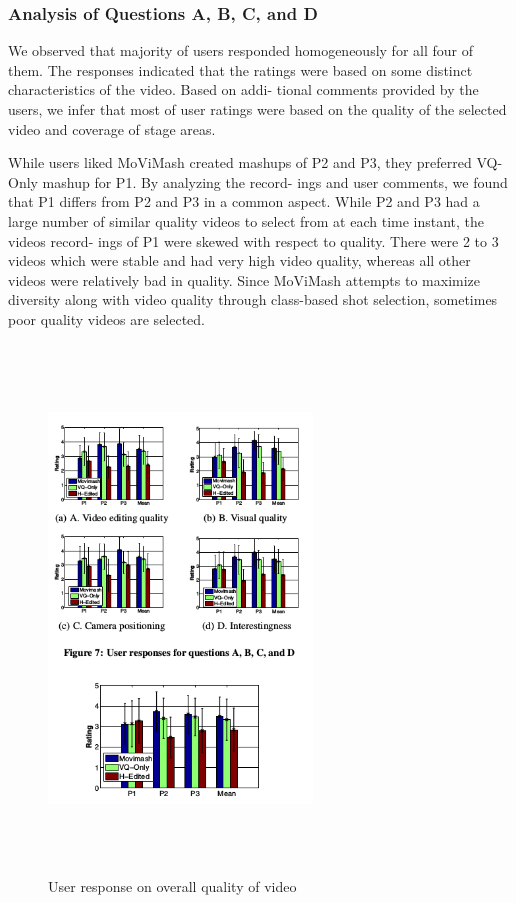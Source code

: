 \documentclass{sig-alternate-05-2015}
\begin{document}
\subsubsection{Analysis of Questions A, B, C, and D}
We observed that majority of users responded homogeneously
for all four of them. The responses indicated that the ratings were
based on some distinct characteristics of the video. Based on addi-
tional comments provided by the users, we infer that most of user
ratings were based on the quality of the selected video and coverage
of stage areas.

While users liked MoViMash created mashups of P2 and P3,
they preferred VQ-Only mashup for P1. By analyzing the record-
ings and user comments, we found that P1 differs from P2 and P3 in
a common aspect. While P2 and P3 had a large number of similar
quality videos to select from at each time instant, the videos record-
ings of P1 were skewed with respect to quality. There were 2 to 3
videos which were stable and had very high video quality, whereas
all other videos were relatively bad in quality. Since MoViMash
attempts to maximize diversity along with video quality through
class-based shot selection, sometimes poor quality videos are selected.
\begin{figure}
\centering
\includegraphics[width=70mm,height=140mm]{graph.png}
\caption{User response on overall quality of video}
\end{figure}
\end{document}
